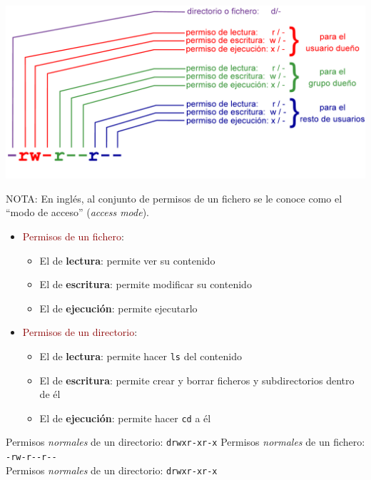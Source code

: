 \documentclass[ucs]{beamer}
\newcommand{\res}[1]{\textcolor{darkred}{#1}}
\begin{document}
\begin{frame}[fragile]

  \begin{center}
  \includegraphics[width=\textwidth]{figs/unix-mode}
  \end{center}

  NOTA: En inglés, al conjunto de permisos de un fichero se le
  conoce como el ``modo de acceso'' (\emph{access mode}).

\end{frame}

\begin{frame}[fragile]

    \begin{itemize}
    \item \res{Permisos de un fichero}:
      \begin{itemize}
      \item El de \textbf{lectura}: permite ver su contenido
      \item El de \textbf{escritura}: permite modificar su contenido
      \item El de \textbf{ejecución}: permite ejecutarlo
      \end{itemize}
    \item \res{Permisos de un directorio}:
      \begin{itemize}
      \item El de \textbf{lectura}: permite hacer \verb|ls| del contenido
      \item El de \textbf{escritura}: permite crear y borrar
        ficheros y subdirectorios dentro de él
      \item El de \textbf{ejecución}: permite hacer \verb|cd| a él
      \end{itemize}
      \end{itemize}
    \begin{tabbing}
      Permisos \emph{normales} de un directorio: \= \verb|drwxr-xr-x|\kill
      Permisos \emph{normales} de un fichero: \> \verb|-rw-r--r--|\\
      Permisos \emph{normales} de un directorio: \> \verb|drwxr-xr-x|
    \end{tabbing}    

\end{frame}
\end{document}
